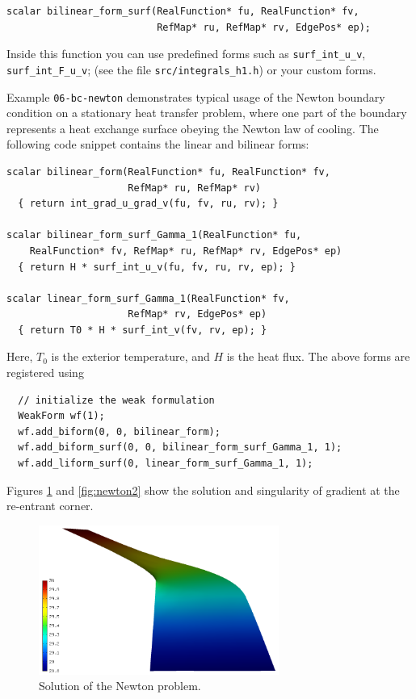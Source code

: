 \documentclass[11pt]{article}
\begin{document}
\begin{lstlisting}
scalar bilinear_form_surf(RealFunction* fu, RealFunction* fv,
                          RefMap* ru, RefMap* rv, EdgePos* ep);
\end{lstlisting}

Inside this function you can use predefined
forms such as \verb"surf_int_u_v", \verb"surf_int_F_u_v"; (see the
file {\tt src/integrals\_h1.h}) or your custom forms.

Example {\tt 06-bc-newton} demonstrates typical usage of the Newton
boundary condition on a stationary heat transfer problem, where one part of the boundary
represents a heat exchange surface obeying the Newton law of cooling.
The following code snippet contains the linear and bilinear forms:

\begin{lstlisting}
scalar bilinear_form(RealFunction* fu, RealFunction* fv,
                     RefMap* ru, RefMap* rv)
  { return int_grad_u_grad_v(fu, fv, ru, rv); }

scalar bilinear_form_surf_Gamma_1(RealFunction* fu,
    RealFunction* fv, RefMap* ru, RefMap* rv, EdgePos* ep)
  { return H * surf_int_u_v(fu, fv, ru, rv, ep); }

scalar linear_form_surf_Gamma_1(RealFunction* fv,
                     RefMap* rv, EdgePos* ep)
  { return T0 * H * surf_int_v(fv, rv, ep); }
\end{lstlisting}

Here, $T_0$ is the exterior temperature, and $H$ is the heat flux.
The above forms are registered using

\begin{lstlisting}
  // initialize the weak formulation
  WeakForm wf(1);
  wf.add_biform(0, 0, bilinear_form);
  wf.add_biform_surf(0, 0, bilinear_form_surf_Gamma_1, 1);
  wf.add_liform_surf(0, linear_form_surf_Gamma_1, 1);
\end{lstlisting}

Figures \ref{fig:newton1} and \ref{fig:newton2} show the solution and
singularity of gradient at the re-entrant corner.

\begin{figure}[!ht]
  \centering\medskip
  \includegraphics[width=0.7\textwidth]{img/newton1.png}
  \caption{Solution of the Newton problem.}
  \label{fig:newton1}
  \vspace{2mm}
\end{figure}
\end{document}
